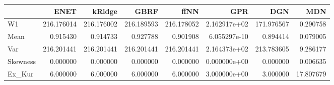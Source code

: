 \begin{tabular}{lrrrrrrr}
\toprule
{} &        ENET &      kRidge &        GBRF &        ffNN &           GPR &         DGN &        MDN \\
\midrule
W1       &  216.176014 &  216.176002 &  216.189593 &  216.178052 &  2.162917e+02 &  171.976567 &   0.290758 \\
Mean     &    0.915430 &    0.914733 &    0.927788 &    0.901908 &  6.055297e-10 &    0.894414 &   0.079005 \\
Var      &  216.201441 &  216.201441 &  216.201441 &  216.201441 &  2.164373e+02 &  213.783605 &   9.286177 \\
Skewness &    0.000000 &    0.000000 &    0.000000 &    0.000000 &  0.000000e+00 &    0.000000 &   0.006635 \\
Ex\_Kur   &    6.000000 &    6.000000 &    6.000000 &    6.000000 &  3.000000e+00 &    3.000000 &  17.807679 \\
\bottomrule
\end{tabular}
